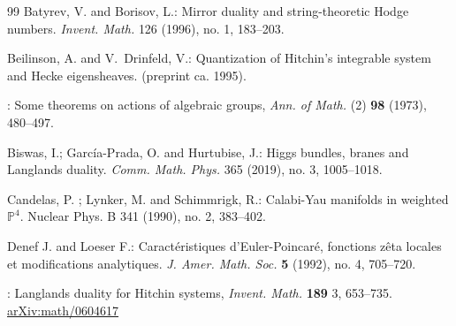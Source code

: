 \begin{thebibliography}{99}
 Batyrev, V. {\rm and} Borisov, L.:
Mirror duality and string-theoretic Hodge numbers. {\em Invent. Math. }126 (1996), no. 1, 183--203.
	
	{ Beilinson, A. {\rm and }V.~Drinfeld, V.}:
	\newblock Quantization of {H}itchin's integrable system and {H}ecke
	eigensheaves.
	\newblock (preprint ca. 1995).
	
	
	
	:
	Some theorems on actions of algebraic groups,
	{\em Ann. of Math.} ({2}) {\bf 98} (1973), 480--497.
	
	 Biswas, I.; García-Prada, O. {\rm and} Hurtubise, J.:
Higgs bundles, branes and Langlands duality. 
{\em Comm. Math. Phys.} 365 (2019), no. 3, 1005--1018.
	
Candelas, P. ; Lynker, M. {\rm and}  Schimmrigk, R.: Calabi-Yau manifolds in weighted ${\mathbb P}^4$. Nuclear Phys. B 341 (1990), no. 2, 383--402.
	
	 Denef J. {\rm and} Loeser F.: Caract\'eristiques d'Euler-Poincar\'e, fonctions z\^{e}ta locales et modifications analytiques. {\em J. Amer. Math. Soc.} {\bf 5} (1992), no. 4, 705--720.
	
	: Langlands duality for Hitchin systems, {\em Invent. Math.} {\bf 189} 3, 653--735. \href{http://arxiv.org/abs/math/0604617}{arXiv:math/0604617}
	
	
	
	
	
	
	

\end{thebibliography}
